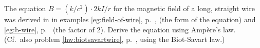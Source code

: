 The equation $B=(k/c^2)\cdot 2kI/r$ for the magnetic field of a long, straight wire was derived in
in examples \ref{eg:field-of-wire}, p.~\pageref{eg:field-of-wire}, (the form of the equation) and
\ref{eg:b-wire}, p.~\pageref{eg:b-wire} (the factor of 2).
Derive the equation using Amp\`{e}re's law. (Cf.~also problem \ref{hw:biotsavartwire}, p.~\pageref{hw:biotsavartwire}, using the Biot-Savart law.)
